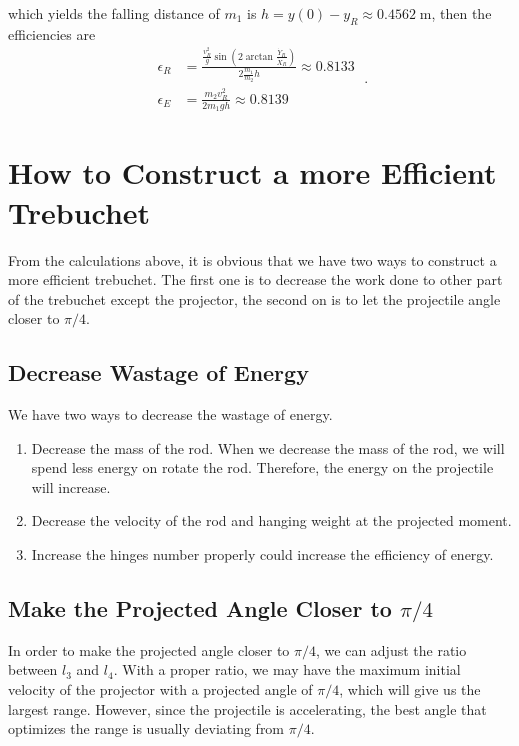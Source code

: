\documentclass[%
reprint,
amsmath,amssymb,
aps,
]{revtex4-1}
\begin{document}
	which yields the falling distance of $m_1$ is $h = y(0) - y_R \approx 0.4562\;\mathrm{m}$, then the efficiencies are
	\begin{equation}
	\begin{aligned}
	\epsilon_R &=\frac{\frac{v_R^2}{g}\sin(2\arctan{\frac{\dot{Y}_R}{\dot{X}_R}})}{2\frac{m_1}{m_2}h}\approx 0.8133\\
	\epsilon_E &=\frac{m_2v_R^2}{2m_1gh}\approx 0.8139
	\end{aligned}\;.
	\end{equation}
	

\section{How to Construct a more Efficient Trebuchet}
From the calculations above, it is obvious that we have two ways to construct a more efficient trebuchet. The first one is to decrease the work done to other part of the trebuchet except the projector, the second on is to let the projectile angle closer to $\pi/4$.
\subsection{Decrease Wastage of Energy}
We have two ways to decrease the wastage of energy.
\begin{enumerate}
    \item Decrease the mass of the rod. When we decrease the mass of the rod, we will spend less energy on rotate the rod. Therefore, the energy on the projectile will increase.
    \item Decrease the velocity of the rod and hanging weight at the projected moment.
    \item Increase the hinges number properly could increase the efficiency of energy.
\end{enumerate}
\subsection{Make the Projected Angle Closer to $\pi/4$}
In order to make the projected angle closer to $\pi/4$, we can adjust the ratio between $l_3$ and $l_4$. With a proper ratio, we may have the maximum initial velocity of the projector with a projected angle of $\pi/4$, which will give us the largest range. However, since the projectile is accelerating, the best angle that optimizes the range is usually deviating from $\pi/4$.
\end{document}
